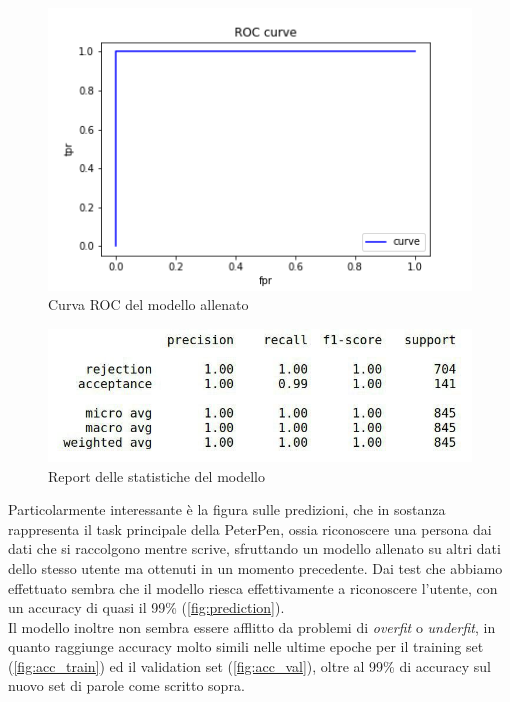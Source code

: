 \documentclass[8pt,notitlepage]{report}
\begin{document}
			\newpage
			
			\begin{figure}[H]
				\begin{center}
					\includegraphics[scale=.5]{ROC_Antonio}
					\caption{Curva ROC del modello allenato}
				\end{center}
			\end{figure}
			
			\begin{figure}[H]
				\begin{center}
					\includegraphics[scale=.4]{measures_table_LSTM}
					\caption{Report delle statistiche del modello}
				\end{center}
			\end{figure}
			\newpage
			Particolarmente interessante è la figura sulle predizioni, che in sostanza rappresenta il task principale della PeterPen, ossia riconoscere una persona dai dati che si raccolgono mentre scrive, sfruttando un modello allenato su altri dati dello stesso utente ma ottenuti in un momento precedente. Dai test che abbiamo effettuato sembra che il modello riesca effettivamente a riconoscere l'utente, con un accuracy di quasi il 99\% (\cref{fig:prediction}). \\
			Il modello inoltre non sembra essere afflitto da problemi di \textit{overfit} o \textit{underfit}, in quanto raggiunge accuracy molto simili nelle ultime epoche per il training set (\cref{fig:acc_train}) ed il validation set (\cref{fig:acc_val}), oltre al 99\% di accuracy sul nuovo set di parole come scritto sopra. \\
\end{document}
